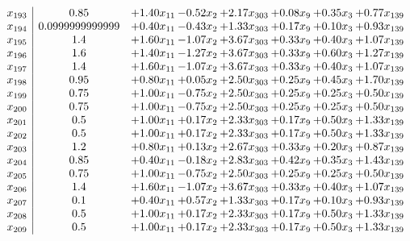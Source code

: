 \documentclass[8pt]{article}
\begin{document}
\[\begin{array}{c| c c@{\hskip 2pt} c@{\hskip 2pt} c@{\hskip 2pt} c@{\hskip 2pt} c@{\hskip 2pt} c@{\hskip 2pt} }
 x_{193}   &  0.85 & +  1.40 x_{11} & -0.52 x_{2} & +  2.17 x_{303} & +  0.08 x_{9} & +  0.35 x_{3} & +  0.77 x_{139}\\
 x_{194}   &  0.0999999999999 & +  0.40 x_{11} & -0.43 x_{2} & +  1.33 x_{303} & +  0.17 x_{9} & +  0.10 x_{3} & +  0.93 x_{139}\\
 x_{195}   &  1.4 & +  1.60 x_{11} & -1.07 x_{2} & +  3.67 x_{303} & +  0.33 x_{9} & +  0.40 x_{3} & +  1.07 x_{139}\\
 x_{196}   &  1.6 & +  1.40 x_{11} & -1.27 x_{2} & +  3.67 x_{303} & +  0.33 x_{9} & +  0.60 x_{3} & +  1.27 x_{139}\\
 x_{197}   &  1.4 & +  1.60 x_{11} & -1.07 x_{2} & +  3.67 x_{303} & +  0.33 x_{9} & +  0.40 x_{3} & +  1.07 x_{139}\\
 x_{198}   &  0.95 & +  0.80 x_{11} & +  0.05 x_{2} & +  2.50 x_{303} & +  0.25 x_{9} & +  0.45 x_{3} & +  1.70 x_{139}\\
 x_{199}   &  0.75 & +  1.00 x_{11} & -0.75 x_{2} & +  2.50 x_{303} & +  0.25 x_{9} & +  0.25 x_{3} & +  0.50 x_{139}\\
 x_{200}   &  0.75 & +  1.00 x_{11} & -0.75 x_{2} & +  2.50 x_{303} & +  0.25 x_{9} & +  0.25 x_{3} & +  0.50 x_{139}\\
 x_{201}   &  0.5 & +  1.00 x_{11} & +  0.17 x_{2} & +  2.33 x_{303} & +  0.17 x_{9} & +  0.50 x_{3} & +  1.33 x_{139}\\
 x_{202}   &  0.5 & +  1.00 x_{11} & +  0.17 x_{2} & +  2.33 x_{303} & +  0.17 x_{9} & +  0.50 x_{3} & +  1.33 x_{139}\\
 x_{203}   &  1.2 & +  0.80 x_{11} & +  0.13 x_{2} & +  2.67 x_{303} & +  0.33 x_{9} & +  0.20 x_{3} & +  0.87 x_{139}\\
 x_{204}   &  0.85 & +  0.40 x_{11} & -0.18 x_{2} & +  2.83 x_{303} & +  0.42 x_{9} & +  0.35 x_{3} & +  1.43 x_{139}\\
 x_{205}   &  0.75 & +  1.00 x_{11} & -0.75 x_{2} & +  2.50 x_{303} & +  0.25 x_{9} & +  0.25 x_{3} & +  0.50 x_{139}\\
 x_{206}   &  1.4 & +  1.60 x_{11} & -1.07 x_{2} & +  3.67 x_{303} & +  0.33 x_{9} & +  0.40 x_{3} & +  1.07 x_{139}\\
 x_{207}   &  0.1 & +  0.40 x_{11} & +  0.57 x_{2} & +  1.33 x_{303} & +  0.17 x_{9} & +  0.10 x_{3} & +  0.93 x_{139}\\
 x_{208}   &  0.5 & +  1.00 x_{11} & +  0.17 x_{2} & +  2.33 x_{303} & +  0.17 x_{9} & +  0.50 x_{3} & +  1.33 x_{139}\\
 x_{209}   &  0.5 & +  1.00 x_{11} & +  0.17 x_{2} & +  2.33 x_{303} & +  0.17 x_{9} & +  0.50 x_{3} & +  1.33 x_{139}\\

\end{array}\]
\end{document}
